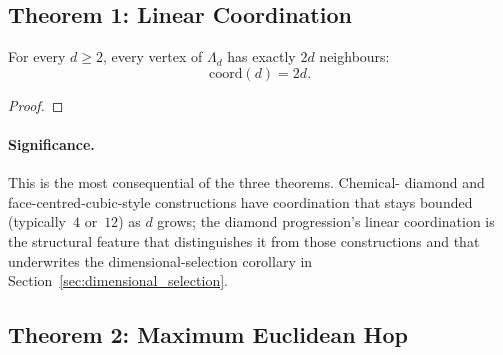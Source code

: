 
\label{sec:three_theorems}


\subsection{Theorem 1: Linear Coordination}
\label{subsec:theorem_1}

\begin{theorem}
\label{thm:coord_2d}
For every $d \geq 2$, every vertex of $\Lambda_d$ has exactly $2d$
neighbours:
\begin{equation*}
\text{coord}(d) = 2d.
\end{equation*}
\end{theorem}

\begin{proof}
\end{proof}

\paragraph{Significance.}
This is the most consequential of the three theorems.  Chemical-
diamond and face-centred-cubic-style constructions have coordination
that stays bounded (typically~$4$ or~$12$) as $d$ grows; the diamond
progression's linear coordination is the structural feature that
distinguishes it from those constructions and that underwrites the
dimensional-selection corollary in
Section~\ref{sec:dimensional_selection}.

\subsection{Theorem 2: Maximum Euclidean Hop}
\label{subsec:theorem_2}

